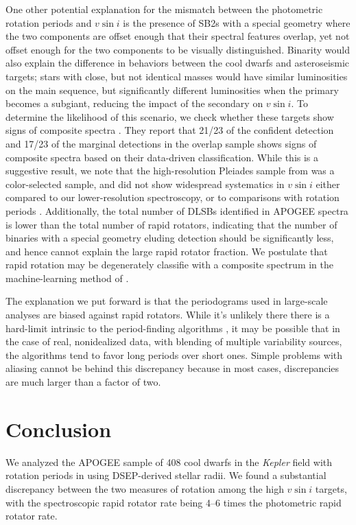 \documentclass[manuscript]{aastex6}
\newcommand{\vsini}{\ensuremath{v \sin i}}
\newcommand{\Kepler}{\mbox{\textit{Kepler}}}
\begin{document}
One other potential explanation for the mismatch between the photometric
rotation periods and \vsini{} is the presence of SB2s with a special geometry
where the two components are offset enough that their spectral features
overlap, yet not offset enough for the two components to be visually
distinguished. Binarity would also explain the difference in behaviors
between the cool dwarfs and asteroseismic targets; stars with close, but
not identical masses would have similar luminosities on the main
sequence, but significantly different luminosities when the primary
becomes a subgiant, reducing the impact of the secondary on
\vsini{}. To determine the likelihood of this scenario, we check whether
these targets show signs of composite spectra \citep{ElBadry18}. They
report that 21/23 of the confident detection and 17/23 of the marginal detections
in the overlap sample shows signs of composite spectra based on their
data-driven classification. While this is a suggestive result, we note
that the high-resolution Pleiades sample from
\citet{Stauffer87} was a color-selected sample, and did not show widespread
systematics in \vsini{} either compared to our
lower-resolution spectroscopy, or to comparisons with rotation periods
\citep{Jackson10}. Additionally, the total
number of DLSBs identified in APOGEE spectra is lower than the total
number of rapid rotators, indicating that the number of binaries with a
special geometry eluding detection should be significantly less, and
hence cannot explain the large rapid rotator fraction. We postulate that
rapid rotation may be degenerately classifie with a composite spectrum
in the machine-learning method of \citet{ElBadry18}.

The explanation we put forward is that the periodograms used in large-scale
analyses are biased against rapid rotators. While it's unlikely there there is
a hard-limit intrinsic to the period-finding algorithms \citep{Aigrain15}, it
may be possible that in the case of real, nonidealized data, with blending of
multiple variability sources, the algorithms tend to favor long periods over
short ones. Simple problems with aliasing cannot be behind this discrepancy
because in most cases, discrepancies are much larger than a factor of two.

\section{Conclusion}
\label{sec:conclusions}

We analyzed the APOGEE sample of 408 cool dwarfs in the \Kepler{} field with 
rotation periods in \citet{McQuillan14} using DSEP-derived stellar radii. We 
found a substantial discrepancy between the two measures of rotation
among the high \vsini{} targets, with the spectroscopic rapid
rotator rate being 4--6 times the photometric rapid rotator rate. 
\end{document}
